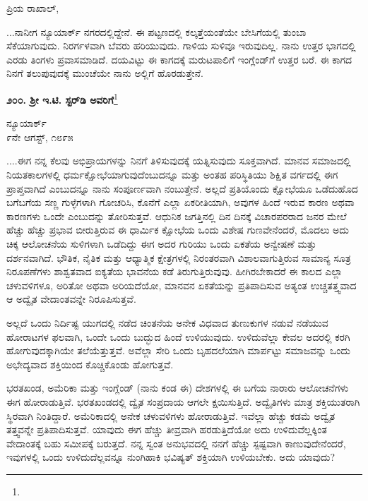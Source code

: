 \noindent
ಪ್ರಿಯ ರಾಖಾಲ್,

...ನಾನೀಗ ನ್ಯೂಯಾರ್ಕ್ ನಗರದಲ್ಲಿದ್ದೇನೆ. ಈ ಪಟ್ಟಣದಲ್ಲಿ ಕಲ್ಕತ್ತೆಯಂತೆಯೇ ಬೇಸಿಗೆಯಲ್ಲಿ ತುಂಬಾ ಸೆಕೆಯಾಗುವುದು. ನಿರರ್ಗಳವಾಗಿ ಬೆವರು ಹರಿಯುವುದು. ಗಾಳಿಯ ಸುಳಿವೂ ಇರುವುದಿಲ್ಲ. ನಾನು ಉತ್ತರ ಭಾಗದಲ್ಲಿ ಎರಡು ತಿಂಗಳು ಪ್ರವಾಸಮಾಡಿದೆ. ದಯವಿಟ್ಟು ಈ ಕಾಗದಕ್ಕೆ ಮರುಟಪಾಲಿಗೆ ಇಂಗ್ಲೆಂಡ್‌ಗೆ ಉತ್ತರ ಬರೆ. ಈ ಕಾಗದ ನಿನಗೆ ತಲುಪುವುದಕ್ಕೆ ಮುಂಚೆಯೇ ನಾನು ಅಲ್ಲಿಗೆ ಹೊರಡುತ್ತೇನೆ.

\begin{center}
\textbf{೨೦೦. ಶ‍್ರೀ ಇ.ಟಿ. ಸ್ಟರ್‌ಡಿ ಅವರಿಗೆ}\footnote{}
\end{center}
\vspace{-0.5cm}

\begin{flushright}
ನ್ಯೂಯಾರ್ಕ್\\೯ನೇ ಆಗಸ್ಟ್, ೧೮೯೫
\end{flushright}
\vspace{-0.2cm}

....ಈಗ ನನ್ನ ಕೆಲವು ಅಭಿಪ್ರಾಯಗಳನ್ನು ನಿನಗೆ ತಿಳಿಸುವುದಕ್ಕೆ ಯತ್ನಿಸುವುದು ಸೂಕ್ತವಾಗಿದೆ. ಮಾನವ ಸಮಾಜದಲ್ಲಿ ನಿಯತಕಾಲಗಳಲ್ಲಿ ಧರ್ಮಕ್ಷೋಭೆಯಾಗುವುದೆಂಬುದನ್ನೂ ಮತ್ತು ಅಂತಹ ಪರಿಸ್ಥಿತಿಯು ಶಿಕ್ಷಿತ ವರ್ಗದಲ್ಲಿ ಈಗ ಪ್ರಾಪ್ತವಾಗಿದೆ ಎಂಬುದನ್ನೂ ನಾನು ಸಂಪೂರ್ಣವಾಗಿ ನಂಬುತ್ತೇನೆ. ಅಲ್ಲದೆ ಪ್ರತಿಯೊಂದು ಕ್ಷೋಭೆಯೂ ಒಡೆದುಹೊದ ಬಗೆಬಗೆಯ ಸಣ್ಣ ಗುಳ್ಳೆಗಳಾಗಿ ಗೋಚರಿಸಿ, ಕೊನೆಗೆ ಎಲ್ಲಾ ಏಕರೀತಿಯಾಗಿ, ಅವುಗಳ ಹಿಂದೆ ಇರುವ ಕಾರಣ ಅಥವಾ ಕಾರಣಗಳು ಒಂದೇ ಎಂಬುದನ್ನು ತೋರಿಸು\break ತ್ತವೆ. ಆಧುನಿಕ ಜಗತ್ತಿನಲ್ಲಿ ದಿನ ದಿನಕ್ಕೆ ವಿಚಾರಪರರಾದ ಜನರ ಮೇಲೆ ಹೆಚ್ಚು ಹೆಚ್ಚು ಪ್ರಭಾವ ಬೀರುತ್ತಿರುವ ಈ ಧಾರ್ಮಿಕ ಕ್ಷೋಭೆಯ ಒಂದು ವಿಶೇಷ ಗುಣವೇನೆಂದರೆ, ಮೊದಲು ಅದು ಚಿಕ್ಕ ಆಲೋಚನೆಯ ಸುಳಿಗಳಾಗಿ ಒಡೆದಿದ್ದು ಈಗ ಅದರ ಗುರಿಯು ಒಂದು ಏಕತೆಯ ಅನ್ವೇಷಣೆ ಮತ್ತು ದರ್ಶನವಾಗಿದೆ. ಭೌತಿಕ, ನೈತಿಕ ಮತ್ತು ಆಧ್ಯಾತ್ಮಿಕ ಕ್ಷೇತ್ರಗಳಲ್ಲಿ ನಿರಂತರವಾಗಿ ವಿಶಾಲವಾಗುತ್ತಿರುವ ಸಾಮಾನ್ಯ ಸೂತ್ರ ನಿರೂಪಣೆಗಳು ಶಾಶ್ವತವಾದ ಐಕ್ಯತೆಯ ಭಾವನೆಯ ಕಡೆ ತಿರುಗುತ್ತಿರುವುವು. ಹೀಗಿರಬೇಕಾದರೆ ಈ ಕಾಲದ ಎಲ್ಲಾ ಚಳುವಳಿಗಳೂ, ಅರಿತೋ ಅಥವಾ ಅರಿಯದೆಯೋ, ಮಾನವನ ಏಕತೆಯನ್ನು ಪ್ರತಿಪಾದಿಸುವ ಅತ್ಯಂತ ಉಚ್ಚತತ್ತ್ವವಾದ ಆ ಅದ್ವೈತ ವೇದಾಂತವನ್ನೇ ನಿರೂಪಿಸುತ್ತವೆ.

\vspace{0.3cm}

ಅಲ್ಲದೆ ಒಂದು ನಿರ್ದಿಷ್ಟ ಯುಗದಲ್ಲಿ ನಡೆದ ಚಿಂತನೆಯ ಅನೇಕ ವಿಧವಾದ ತುಣುಕುಗಳ ನಡುವೆ ನಡೆಯುವ ಹೋರಾಟಗಳ ಫಲವಾಗಿ, ಒಂದೇ ಒಂದು ಬುದ್ಭುದ ಹಿಂದೆ ಉಳಿಯುವುದು. ಉಳಿದುವೆಲ್ಲಾ ಕೇವಲ ಅದರಲ್ಲಿ ಕರಗಿ ಹೋಗುವುದಕ್ಕಾಗಿಯೇ ತಲೆಯೆತ್ತುತ್ತವೆ. ಅವೆಲ್ಲಾ ಸೇರಿ ಒಂದು ಬೃಹದಲೆಯಾಗಿ ಮಾರ್ಪಟ್ಟು ಸಮಾಜವನ್ನು ಒಂದು ಅಭೇದ್ಯವಾದ ಶಕ್ತಿಯಿಂದ ಕೊಚ್ಚಿಕೊಂಡು ಹೋಗುತ್ತವೆ.

\vspace{0.3cm}

ಭರತಖಂಡ, ಅಮೆರಿಕಾ ಮತ್ತು ಇಂಗ್ಲೆಂಡ್ (ನಾನು ಕಂಡ ಈ) ದೇಶಗಳಲ್ಲಿ ಈ ಬಗೆಯ ನಾರಾರು ಆಲೋಚನೆಗಳು ಈಗ ಹೋರಾಡುತ್ತಿವೆ. ಭರತಖಂಡದಲ್ಲಿ ದ್ವೈತ ಸಂಪ್ರದಾಯ ಆಗಲೇ ಕ್ಷಯಿಸುತ್ತಿದೆ. ಅದ್ವೈತಿಗಳು ಮಾತ್ರ ಶಕ್ತಿಯುತರಾಗಿ ಸ್ಥಿರವಾಗಿ ನಿಂತಿದ್ದಾರೆ. ಅಮೆರಿಕಾದಲ್ಲಿ ಅನೇಕ ಚಳುವಳಿಗಳು ಹೋರಾಡುತ್ತಿವೆ. ಇವೆಲ್ಲಾ ಹೆಚ್ಚು ಕಡಮೆ ಅದ್ವೈತ ತತ್ತ್ವವನ್ನೇ ಪ್ರತಿಪಾದಿಸುತ್ತವೆ. ಯಾವುದು ಈಗ ಹೆಚ್ಚು ತೀವ್ರವಾಗಿ ಹರಡುತ್ತಿದೆಯೋ ಅದು ಉಳಿದುವೆಲ್ಲಕ್ಕಿಂತ ವೇದಾಂತಕ್ಕೆ ಬಹು ಸಮೀಪಕ್ಕೆ ಬರುತ್ತದೆ. ನನ್ನ ಸ್ವಂತ ಅನುಭವದಲ್ಲಿ ನನಗೆ ಹೆಚ್ಚು ಸ್ಪಷ್ಟವಾಗಿ ಕಾಣುವುದೇನೆಂದರೆ, ಇವುಗಳಲ್ಲಿ ಒಂದು ಉಳಿದುದೆಲ್ಲವನ್ನೂ ನುಂಗಿಹಾಕಿ ಭವಿಷ್ಯತ್ ಶಕ್ತಿಯಾಗಿ ಉಳಿಯಬೇಕು. ಅದು ಯಾವುದು?

